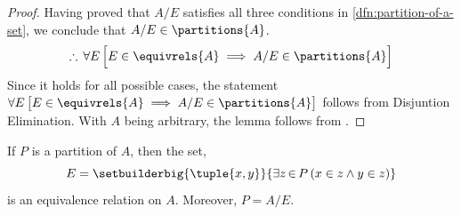 \begin{proof}
    \vspace{0.3cm}
    \noindent
    Having proved that \( A / E \) satisfies all three conditions in \cref{dfn:partition-of-a-set}, we conclude that \( A / E \in \partitions{A} \).
    \begin{equation*}
        \therefore \, \forall E \, \Big[ E \in \equivrels{A} \implies A / E \in \partitions{A} \Big]
    \end{equation*}
    Since it holds for all possible cases, the statement \( \forall E \, \big[ E \in \equivrels{A} \implies A / E \in \partitions{A} \big] \) follows from Disjuntion Elimination.
    With \( A \) being arbitrary, the lemma follows from .
\end{proof}

\begin{lem}
    \label{lem:any-partition-of-a-set-defines-an-equivalece-relation-on-the-set}
    If \( P \) is a partition of \( A \), then the set,
    \begin{equation*}
        E = \setbuilderbig{\tuple{x,y}}{\exists z\,{\in}\,P \, \mleft( x \in z \land y \in z \mright)}
    \end{equation*}
    is an equivalence relation on \( A \). Moreover, \( P = A / E \).
\end{lem}


